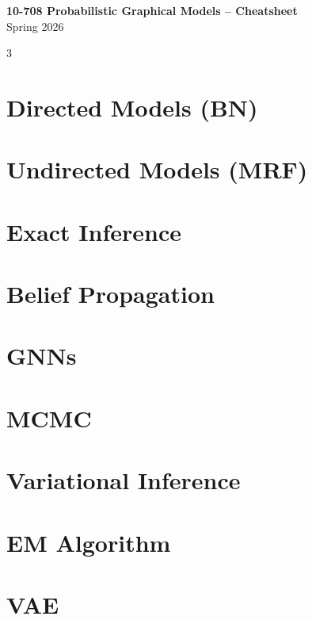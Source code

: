 \documentclass[10pt,landscape]{article}
\begin{document}
\begin{center}
{\large \textbf{10-708 Probabilistic Graphical Models -- Cheatsheet}} \\
Spring 2026
\end{center}

\begin{multicols}{3}

\section*{Directed Models (BN)}


\section*{Undirected Models (MRF)}


\section*{Exact Inference}


\section*{Belief Propagation}


\section*{GNNs}


\section*{MCMC}


\section*{Variational Inference}


\section*{EM Algorithm}


\section*{VAE}


\end{multicols}
\end{document}
